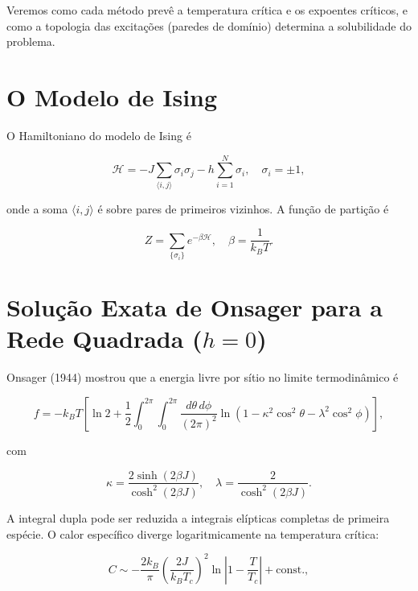 \documentclass[12pt]{article}
\begin{document}
Veremos como cada método prevê a temperatura crítica e os expoentes críticos, e como a topologia das excitações (paredes de domínio) determina a solubilidade do problema.

\section{O Modelo de Ising}

O Hamiltoniano do modelo de Ising é

\begin{equation}
    \mathcal{H} = -J \sum_{\langle i,j \rangle} \sigma_i \sigma_j - h \sum_{i=1}^N \sigma_i, \quad \sigma_i = \pm 1,
\end{equation}

onde a soma \(\langle i,j \rangle\) é sobre pares de primeiros vizinhos. A função de partição é

\begin{equation}
    Z = \sum_{\{\sigma_i\}} e^{-\beta \mathcal{H}}, \quad \beta = \frac{1}{k_B T}.
\end{equation}

\section{Solução Exata de Onsager para a Rede Quadrada (\(h=0\))}

Onsager (1944) mostrou que a energia livre por sítio no limite termodinâmico é

\begin{equation}
    f = -k_B T \left[ \ln 2 + \frac{1}{2} \int_0^{2\pi} \int_0^{2\pi} \frac{d\theta\, d\phi}{(2\pi)^2} \ln \left( 1 - \kappa^2 \cos^2\theta - \lambda^2 \cos^2\phi \right) \right],
\end{equation}

com

\begin{equation}
    \kappa = \frac{2 \sinh(2\beta J)}{\cosh^2(2\beta J)}, \quad
    \lambda = \frac{2}{\cosh^2(2\beta J)}.
\end{equation}

A integral dupla pode ser reduzida a integrais elípticas completas de primeira espécie. O calor específico diverge logaritmicamente na temperatura crítica:

\begin{equation}
    C \sim -\frac{2k_B}{\pi} \left( \frac{2J}{k_B T_c} \right)^2 \ln\left| 1 - \frac{T}{T_c} \right| + \text{const.},
\end{equation}
\end{document}
